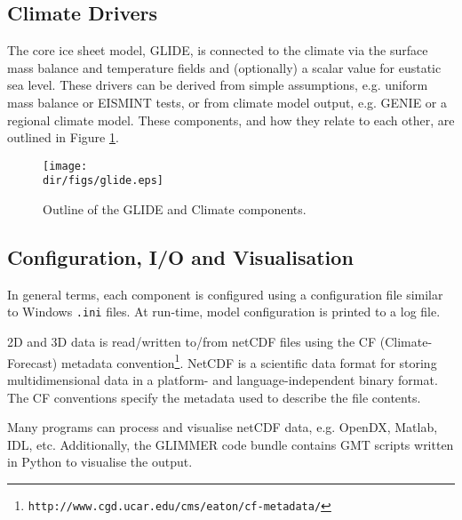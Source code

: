 \subsection{Climate Drivers}
\label{subsec:climdrive}
The core ice sheet model, GLIDE, is connected to the climate via the surface mass balance and temperature fields and (optionally) a scalar value for eustatic sea level. These drivers can be derived from simple assumptions, e.g. uniform mass balance or EISMINT tests, or from climate model output, e.g. GENIE or a regional climate model. These components, and how they relate to each other, are outlined in Figure \ref{ug.glide}.
%
\begin{figure}[htbp]
 \begin{center}
   \texttt{[image: \\dir/figs/glide.eps]}
 \end{center}
 \caption{Outline of the GLIDE and Climate components.}
\label{ug.glide}
\end{figure}
%
\subsection{Configuration, I/O and Visualisation}
In general terms, each component is configured using a configuration file similar to Windows \texttt{.ini} files. At run-time, model configuration is printed to a log file. 

2D and 3D data is read/written to/from netCDF files using the CF (Climate-Forecast) metadata convention\footnote{\texttt{http://www.cgd.ucar.edu/cms/eaton/cf-metadata/}}. NetCDF is a scientific data format for storing multidimensional data in a platform- and language-independent binary format. The CF conventions specify the metadata used to describe the file contents.

Many programs can process and visualise netCDF data, e.g. OpenDX, Matlab, IDL, etc. Additionally, the GLIMMER code bundle contains GMT scripts written in Python to visualise the output.
